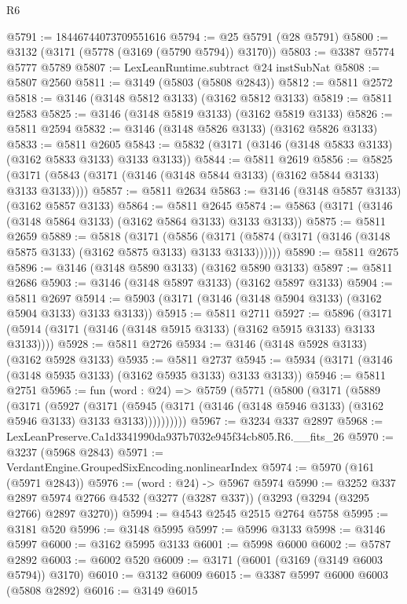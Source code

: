 \begin{lexlean}{R6}
\begin{coremodule}
@5791 := 18446744073709551616
@5794 := @25 @5791 (@28 @5791)
@5800 := @3132 (@3171 (@5778 (@3169 (@5790 @5794)) @3170))
@5803 := @3387 @5774 @5777 @5789
@5807 := LexLeanRuntime.subtract @24 instSubNat
@5808 := @5807 @2560
@5811 := @3149 (@5803 (@5808 @2843))
@5812 := @5811 @2572
@5818 := @3146 (@3148 @5812 @3133) (@3162 @5812 @3133)
@5819 := @5811 @2583
@5825 := @3146 (@3148 @5819 @3133) (@3162 @5819 @3133)
@5826 := @5811 @2594
@5832 := @3146 (@3148 @5826 @3133) (@3162 @5826 @3133)
@5833 := @5811 @2605
@5843 := @5832 (@3171 (@3146 (@3148 @5833 @3133) (@3162 @5833 @3133) @3133 @3133))
@5844 := @5811 @2619
@5856 := @5825 (@3171 (@5843 (@3171 (@3146 (@3148 @5844 @3133) (@3162 @5844 @3133) @3133 @3133))))
@5857 := @5811 @2634
@5863 := @3146 (@3148 @5857 @3133) (@3162 @5857 @3133)
@5864 := @5811 @2645
@5874 := @5863 (@3171 (@3146 (@3148 @5864 @3133) (@3162 @5864 @3133) @3133 @3133))
@5875 := @5811 @2659
@5889 := @5818
    (@3171
      (@5856 (@3171 (@5874 (@3171 (@3146 (@3148 @5875 @3133) (@3162 @5875 @3133) @3133 @3133))))))
@5890 := @5811 @2675
@5896 := @3146 (@3148 @5890 @3133) (@3162 @5890 @3133)
@5897 := @5811 @2686
@5903 := @3146 (@3148 @5897 @3133) (@3162 @5897 @3133)
@5904 := @5811 @2697
@5914 := @5903 (@3171 (@3146 (@3148 @5904 @3133) (@3162 @5904 @3133) @3133 @3133))
@5915 := @5811 @2711
@5927 := @5896 (@3171 (@5914 (@3171 (@3146 (@3148 @5915 @3133) (@3162 @5915 @3133) @3133 @3133))))
@5928 := @5811 @2726
@5934 := @3146 (@3148 @5928 @3133) (@3162 @5928 @3133)
@5935 := @5811 @2737
@5945 := @5934 (@3171 (@3146 (@3148 @5935 @3133) (@3162 @5935 @3133) @3133 @3133))
@5946 := @5811 @2751
@5965 := fun (word : @24) =>
  @5759
    (@5771
      (@5800
        (@3171
          (@5889
            (@3171
              (@5927
                (@3171
                  (@5945 (@3171 (@3146 (@3148 @5946 @3133) (@3162 @5946 @3133) @3133 @3133))))))))))
@5967 := @3234 @337 @2897
@5968 := LexLeanPreserve.Ca1d3341990da937b7032e945f34cb805.R6.__fits_26
@5970 := @3237 (@5968 @2843)
@5971 := VerdantEngine.GroupedSixEncoding.nonlinearIndex
@5974 := @5970 (@161 (@5971 @2843))
@5976 := (word : @24) -> @5967 @5974
@5990 := @3252
    @337
    @2897
    @5974
    @2766
    @4532
    (@3277 (@3287 @337))
    (@3293 (@3294 (@3295 @2766) @2897 @3270))
@5994 := @4543 @2545 @2515 @2764 @5758
@5995 := @3181 @520
@5996 := @3148 @5995
@5997 := @5996 @3133
@5998 := @3146 @5997
@6000 := @3162 @5995 @3133
@6001 := @5998 @6000
@6002 := @5787 @2892
@6003 := @6002 @520
@6009 := @3171 (@6001 (@3169 (@3149 @6003 @5794)) @3170)
@6010 := @3132 @6009
@6015 := @3387 @5997 @6000 @6003 (@5808 @2892)
@6016 := @3149 @6015

\end{coremodule}
\end{lexlean}

